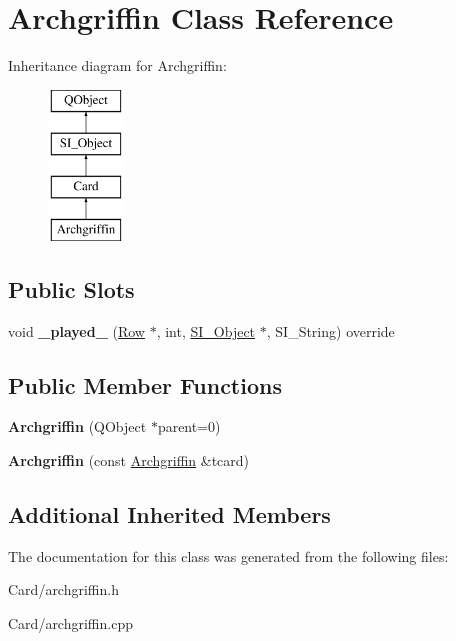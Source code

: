\hypertarget{class_archgriffin}{}\section{Archgriffin Class Reference}
\label{class_archgriffin}
Inheritance diagram for Archgriffin\+:\begin{figure}[H]
\begin{center}
\leavevmode
\includegraphics[height=4.000000cm]{class_archgriffin}
\end{center}
\end{figure}
\subsection*{Public Slots}
\begin{DoxyCompactItemize}
\item 
\mbox{\label{class_archgriffin_a2691d305b4e74723c4288cf67b4a4bcc}} 
void {\bfseries \+\_\+played\+\_\+} (\hyperlink{class_card_set}{Row} $\ast$, int, \hyperlink{class_s_i___object}{S\+I\+\_\+\+Object} $\ast$, S\+I\+\_\+\+String) override
\end{DoxyCompactItemize}
\subsection*{Public Member Functions}
\begin{DoxyCompactItemize}
\item 
\mbox{\label{class_archgriffin_aa07076adf62e10bd4c12c93dafef5e40}} 
{\bfseries Archgriffin} (Q\+Object $\ast$parent=0)
\item 
\mbox{\label{class_archgriffin_aac9db9edebb3eca4cca0574f2b8e6a55}} 
{\bfseries Archgriffin} (const \hyperlink{class_archgriffin}{Archgriffin} \&tcard)
\end{DoxyCompactItemize}
\subsection*{Additional Inherited Members}


The documentation for this class was generated from the following files\+:\begin{DoxyCompactItemize}
\item 
Card/archgriffin.\+h\item 
Card/archgriffin.\+cpp\end{DoxyCompactItemize}
